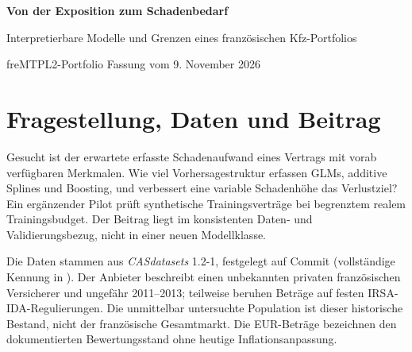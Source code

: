 \documentclass[11pt,a4paper]{article}
\newcommand{\code}[1]{\texttt{\detokenize{#1}}}
\begin{document}
\begin{center}
{\LARGE\bfseries Von der Exposition zum Schadenbedarf\par}
\vspace{5pt}
{\large Interpretierbare Modelle und Grenzen eines französischen Kfz-Portfolios\par}
\vspace{5pt}
{\small freMTPL2-Portfolio \quad Fassung vom 9. November 2026}
\end{center}
\begin{abstract}
\noindent Die Studie verbindet den Abgleich eines historischen Kfz-Haftpflichtbestands mit exponierungsabhängigen Frequenzmodellen und einer separaten Schadenhöhe. Im begrenzten Entwicklungsvergleich liefert Histogramm-Poisson-Boosting die beste Frequenzvorhersage. Die vor der Evaluation gewählte Kombination mit dem arithmetischen Trainingsschadenmittel reduziert dort die Verlustdeviance gegenüber der Interceptbasis um \EvalGain\,\%. Komplexere Schadenhöhen sind damit nicht allgemein widerlegt. Ein explorativer Vergleich mit festem Alter bevorzugt zunächst Alter und Bonus-Malus; eine Erweiterung um Einzelmerkmale und Bonus-Malus plus Area präzisiert die Merkmalswahl; die Trennung von reduziertem GLM und GAM bleibt unsicher. Ein anschließender CTGAN-Pilot verschlechtert die reale OOF-Frequenzdeviance gegenüber real-only und Bootstrap-Kontrollen. Dauerabhängige Fehlkalibrierung, große Schäden und fehlende Nutzungsinformationen verhindern eine unmittelbare Tarifempfehlung.
\end{abstract}
\section{Fragestellung, Daten und Beitrag}
Gesucht ist der erwartete erfasste Schadenaufwand eines Vertrags mit vorab verfügbaren Merkmalen. Wie viel Vorhersagestruktur erfassen GLMs, additive Splines und Boosting, und verbessert eine variable Schadenhöhe das Verlustziel? Ein ergänzender Pilot prüft synthetische Trainingsverträge bei begrenztem realem Trainingsbudget. Der Beitrag liegt im konsistenten Daten- und Validierungsbezug, nicht in einer neuen Modellklasse.

Die Daten stammen aus \emph{CASdatasets} 1.2-1, festgelegt auf Commit \code{227fb56b8734} (vollständige Kennung in \cite{cas}). Der Anbieter beschreibt einen unbekannten privaten französischen Versicherer und ungefähr 2011--2013; teilweise beruhen Beträge auf festen IRSA-IDA-Regulierungen. Die unmittelbar untersuchte Population ist dieser historische Bestand, nicht der französische Gesamtmarkt. Die EUR-Beträge bezeichnen den dokumentierten Bewertungsstand ohne heutige Inflationsanpassung.
\end{document}
